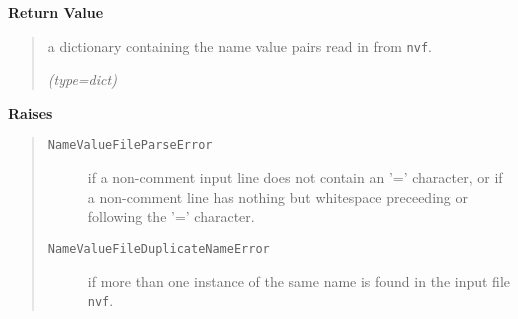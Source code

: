\begin{boxedminipage}{\funcwidth}
      \textbf{Return Value}
    \vspace{-1ex}

      \begin{quote}
      a dictionary containing the name value pairs read in from 
      \texttt{nvf}.

      {\it (type=dict)}

      \end{quote}

      \textbf{Raises}
    \vspace{-1ex}

      \begin{quote}
        \begin{description}

          \item[\texttt{NameValueFileParseError}]

          if a non-comment input line does not contain an '=' character, or
          if a non-comment line has nothing but whitespace preceeding or 
          following the '=' character.

          \item[\texttt{NameValueFileDuplicateNameError}]

          if more than one instance of the same name is found in the input 
          file \texttt{nvf}.

        \end{description}

      \end{quote}

    \end{boxedminipage}

    \label{satstress:SatStress:test}

    \vspace{0.5ex}

